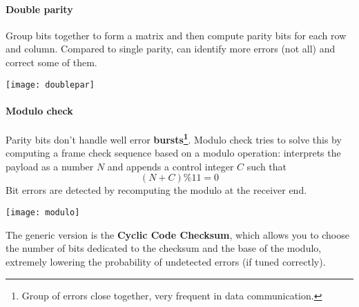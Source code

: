 \paragraph{Double parity}
Group bits together to form a matrix and then compute parity bits for each row and column. Compared to single parity, can identify more errors (not all) and correct some of them.
\begin{center}
	\texttt{[image: doublepar]}
\end{center}

\paragraph{Modulo check}
Parity bits don't handle well error \textbf{bursts\footnote{Group of errors close together, very frequent in data communication.}}. Modulo check tries to solve this by computing a frame check sequence based on a modulo operation: interprets the payload as a number $N$ and appends a control integer $C$ such that
\begin{equation*}
	(N + C) \% 11 = 0
\end{equation*}
Bit errors are detected by recomputing the modulo at the receiver end.
\begin{center}
	\texttt{[image: modulo]}
\end{center}
The generic version is the \textbf{Cyclic Code Checksum}, which allows you to choose the number of bits dedicated to the checksum and the base of the modulo, extremely lowering the probability of undetected errors (if tuned correctly).

